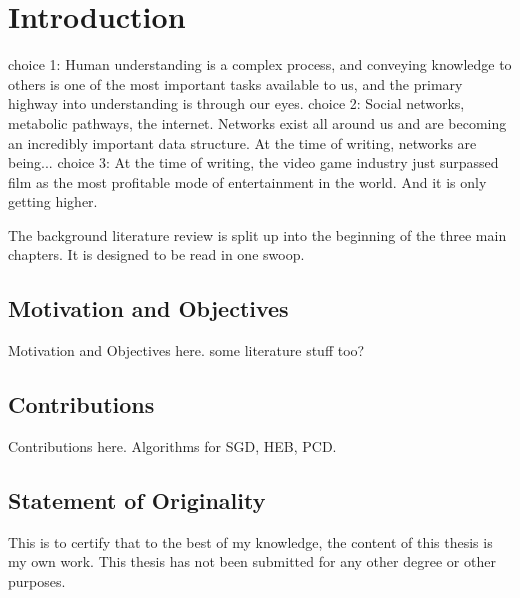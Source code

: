 \chapter{Introduction}
choice 1: Human understanding is a complex process, and conveying knowledge to others is one of the most important tasks available to us, and the primary highway into understanding is through our eyes.
choice 2: Social networks, metabolic pathways, the internet. Networks exist all around us and are becoming an incredibly important data structure. At the time of writing, networks are being...
choice 3: At the time of writing, the video game industry just surpassed film as the most profitable mode of entertainment in the world. And it is only getting higher.


The background literature review is split up into the beginning of the three main chapters. It is designed to be read in one swoop.

\section{Motivation and Objectives}

Motivation and Objectives here.
some literature stuff too?

\section{Contributions}

Contributions here.
Algorithms for SGD, HEB, PCD.


\section{Statement of Originality}
This is to certify that to the best of my knowledge, the content of this thesis is my own work. This thesis has not been submitted for any other degree or other purposes.

